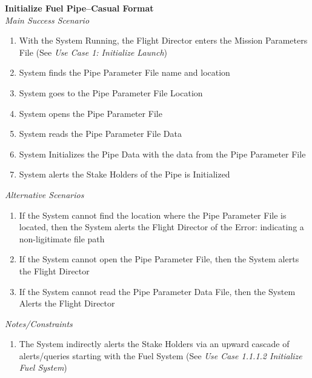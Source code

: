 \documentclass[letterpaper]{article}
\begin{document}
\noindent
\textbf{Initialize Fuel Pipe--Casual Format}\\
\textit{Main Success Scenario}
\begin{enumerate}
   \item With the System Running, the Flight Director enters the
      Mission Parameters File 
      (See \textit{Use Case 1:  Initialize Launch})
   \item System finds the Pipe Parameter File name and location
   \item System goes to the Pipe Parameter File Location
   \item System opens the Pipe Parameter File
   \item System reads the Pipe Parameter File Data
   \item System Initializes the Pipe Data with the data from the Pipe
      Parameter File
   \item System alerts the Stake Holders of the Pipe is Initialized
\end{enumerate}
\textit{Alternative Scenarios}
\begin{enumerate}
   \item[2a, 3a]If the System cannot find the location where the 
      Pipe Parameter File is located, then the System alerts the 
      Flight Director of the Error:  indicating a non-ligitimate file
      path
   \item[4a]If the System cannot open the Pipe Parameter File, then
      the System alerts the Flight Director
   \item[5a]If the System cannot read the Pipe Parameter Data File,
      then the System Alerts the Flight Director
\end{enumerate}
\textit{Notes/Constraints}
\begin{enumerate}
   \item[7a]The System indirectly alerts the Stake Holders via an 
      upward cascade of alerts/queries starting with the Fuel System
      (See \textit{Use Case 1.1.1.2 Initialize Fuel System})
\end{enumerate}
\end{document}
